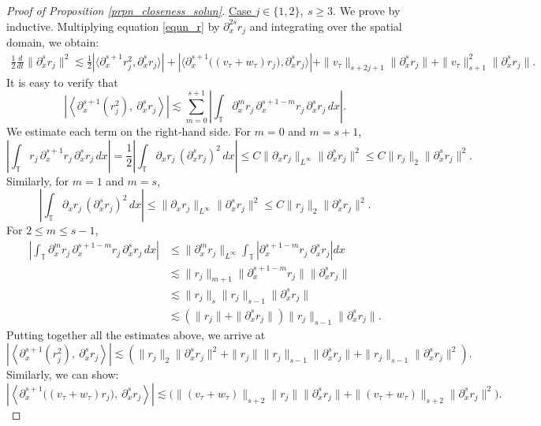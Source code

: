 \documentclass[10pt, reqno]{amsart}
\numberwithin{equation}{section}
\begin{document}
\begin{proof}[Proof of Proposition \ref{prpn_closeness_solun}]
\underline{Case \( j \in \{1, 2\}, \ s \ge 3 \)}. We prove by inductive. Multiplying equation \eqref{equn_r} by \( \partial_x^{2s} r_j \) and integrating over the spatial domain, we obtain:
\begin{align*}
	\frac{1}{2} \frac{d}{dt} \| \partial_x^s r_j\|^2 \lesssim \frac{1}{2} |\langle \partial_x^{s + 1}r_j^2, \partial_x^s r_j \rangle| +  |\langle \partial_x^{s + 1} \Big((v_{\tau} + w_{\tau}) r_j\Big), \partial_x^s r_j\rangle| + \| v_{\tau}\|_{s + 2j + 1} \| \partial_x^s r_j\| + \| v_{\tau}\|^2_{s + 1} \| \partial_x^s r_j\|.
\end{align*}
It is easy to verify that
\[
\left| \left\langle \partial_x^{s+1}(r_j^2),\ \partial_x^s r_j \right\rangle \right| \lesssim \sum_{m=0}^{s+1} \left| \int_{\mathbb{T}} \partial_x^m r_j\, \partial_x^{s+1-m} r_j\, \partial_x^s r_j\, dx \right|.
\]
We estimate each term on the right-hand side. For \( m = 0 \) and \( m = s+1 \), 
\[
\left| \int_{\mathbb{T}} r_j\, \partial_x^{s+1} r_j\, \partial_x^s r_j\, dx \right| = \frac{1}{2} \left| \int_{\mathbb{T}} \partial_x r_j\, (\partial_x^s r_j)^2\, dx \right| \leq C \|\partial_x r_j\|_{L^{\infty}} \|\partial_x^s r_j\|^2 \leq C \|r_j\|_{2} \|\partial_x^s r_j\|^2.
\]
Similarly, for \( m = 1 \) and \( m = s \), 
\[
\left| \int_{\mathbb{T}} \partial_x r_j\, (\partial_x^s r_j)^2\, dx \right| \leq \|\partial_x r_j\|_{L^{\infty}} \|\partial_x^s r_j\|^2 \leq C \|r_j\|_{2} \|\partial_x^s r_j\|^2.
\]
For \( 2 \leq m \leq s - 1 \),
\begin{align*}
	\left| \int_{\mathbb{T}} \partial_x^m r_j\, \partial_x^{s+1 - m} r_j\, \partial_x^s r_j\, dx \right| 
	& \leq \|\partial_x^m r_j\|_{L^\infty} \int_{\mathbb{T}} \left| \partial_x^{s+1 - m} r_j \ \partial_x^s r_j \right| dx \\
	& \lesssim \|r_j\|_{{m+1}} \|\partial_x^{s+1 - m} r_j\| \|\partial_x^s r_j\| \\
	& \lesssim \|r_j\|_{s} \|r_j\|_{{s-1}} \|\partial_x^s r_j\| \\
	& \lesssim \left( \|r_j\| + \|\partial_x^s r_j\| \right) \|r_j\|_{{s-1}} \|\partial_x^s r_j\|.
\end{align*}
Putting together all the estimates above, we arrive at
\[
\left| \left\langle \partial_x^{s+1}(r_j^2),\ \partial_x^s r_j \right\rangle \right| \lesssim \left( \|r_j\|_{2} \|\partial_x^s r_j\|^2 + \|r_j\| \|r_j\|_{{s-1}} \|\partial_x^s r_j\| + \|r_j\|_{{s-1}} \|\partial_x^s r_j\|^2 \right).
\]
Similarly, we can show:  
\[
\left| \left\langle  \partial_x^{s + 1} \Big((v_{\tau} + w_{\tau}) r_j\Big),\ \partial_x^s r_j \right\rangle \right| \lesssim \Big(\|(v_{\tau} + w_{\tau})\|_{s+2} \|r_j\| \|\partial_x^s r_j\| + \|(v_{\tau} + w_{\tau})\|_{s+2} \|\partial_x^s r_j\|^2\Big).
\]
\end{proof}
\end{document}
